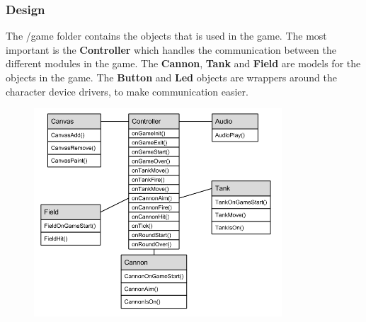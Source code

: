 \subsubsection{Design}

The /game folder contains the objects that is used in the game. The most important is the {\bf Controller}
which handles the communication between the different modules in the game. The {\bf Cannon}, {\bf Tank} and
{\bf Field} are models for the objects in the game. The {\bf Button} and {\bf Led} objects are
wrappers around the character device drivers, to make communication easier.

\begin{figure}[h]
  \includegraphics[width=350px]{graphics/game_UML.png}
\end{figure}

